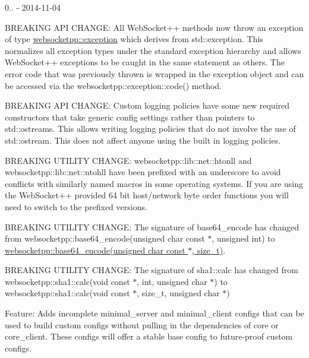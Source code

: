 0.. -\/ 2014-\/11-\/04
\begin{DoxyItemize}
\item B\+R\+E\+A\+K\+I\+NG A\+PI C\+H\+A\+N\+GE\+: All Web\+Socket++ methods now throw an exception of type {\ttfamily \hyperlink{classwebsocketpp_1_1exception}{websocketpp\+::exception}} which derives from {\ttfamily std\+::exception}. This normalizes all exception types under the standard exception hierarchy and allows Web\+Socket++ exceptions to be caught in the same statement as others. The error code that was previously thrown is wrapped in the exception object and can be accessed via the {\ttfamily websocketpp\+::exception\+::code()} method.
\item B\+R\+E\+A\+K\+I\+NG A\+PI C\+H\+A\+N\+GE\+: Custom logging policies have some new required constructors that take generic config settings rather than pointers to std\+::ostreams. This allows writing logging policies that do not involve the use of std\+::ostream. This does not affect anyone using the built in logging policies.
\item B\+R\+E\+A\+K\+I\+NG U\+T\+I\+L\+I\+TY C\+H\+A\+N\+GE\+: {\ttfamily websocketpp\+::lib\+::net\+::htonll} and {\ttfamily websocketpp\+::lib\+::net\+::ntohll} have been prefixed with an underscore to avoid conflicts with similarly named macros in some operating systems. If you are using the Web\+Socket++ provided 64 bit host/network byte order functions you will need to switch to the prefixed versions.
\item B\+R\+E\+A\+K\+I\+NG U\+T\+I\+L\+I\+TY C\+H\+A\+N\+GE\+: The signature of {\ttfamily base64\+\_\+encode} has changed from {\ttfamily websocketpp\+::base64\+\_\+encode(unsigned char const $\ast$, unsigned int)} to {\ttfamily \hyperlink{namespacewebsocketpp_aff36d40583424a2c879df02219133af8}{websocketpp\+::base64\+\_\+encode(unsigned char const $\ast$, size\+\_\+t)}}.
\item B\+R\+E\+A\+K\+I\+NG U\+T\+I\+L\+I\+TY C\+H\+A\+N\+GE\+: The signature of {\ttfamily sha1\+::calc} has changed from {\ttfamily websocketpp\+::sha1\+::calc(void const $\ast$, int, unsigned char $\ast$)} to {\ttfamily websocketpp\+::sha1\+::calc(void const $\ast$, size\+\_\+t, unsigned char $\ast$)}
\item Feature\+: Adds incomplete {\ttfamily minimal\+\_\+server} and {\ttfamily minimal\+\_\+client} configs that can be used to build custom configs without pulling in the dependencies of {\ttfamily core} or {\ttfamily core\+\_\+client}. These configs will offer a stable base config to future-\/proof custom configs.

\end{DoxyItemize}
